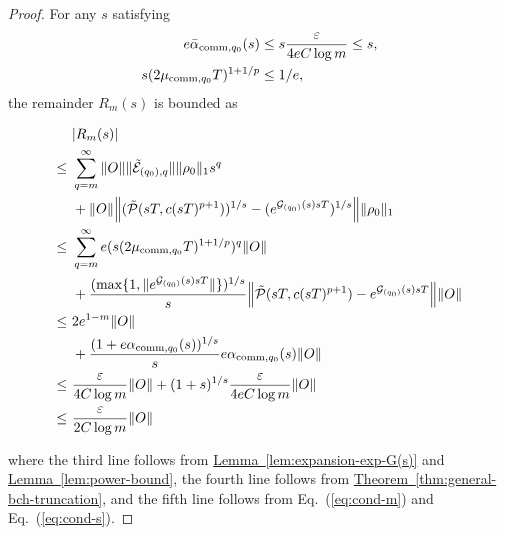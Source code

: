\documentclass[aps,pra,reprint,groupedaddress,floatfix]{revtex4-2}
\newcommand{\eq}[1]{(\ref{eq:#1})}
\newcommand{\thm}[1]{\hyperref[thm:#1]{Theorem~\ref*{thm:#1}}}
\newcommand{\lem}[1]{\hyperref[lem:#1]{Lemma~\ref*{lem:#1}}}
\newcommand{\G}{\mathcal{G}}
\newcommand{\E}{\mathcal{E}}
\newcommand{\eps}{\varepsilon}
\newcommand{\mc}{\mathcal}
\begin{document}
\begin{proof}
   
    For any $s$ satisfying \begin{align}
    \label{eq:cond-s}
        e\bar\alpha_{\mathrm{comm},q_0}(s)
        &\le s\frac{\eps}{4eC \log m} \le s, \notag\\
        s(2\mu_{\mathrm{comm},q_0}T)^{1+1/p}
        &\le 1/e,
    \end{align} the remainder $R_m(s)$ is bounded as
    \begin{widetext}
    \begin{align*}
        &|R_m(s)| \\
        \le ~&\sum_{q=m}^{\infty}\|O\|\|\tilde{\E}_{(q_0),q}\|\|\rho_0\|_1 s^q \\
        &+\|O\|\Big\|(\tilde{\mc P}(sT, c(sT)^{p+1}))^{1/s}
        -(e^{\G_{(q_0)}(s)sT})^{1/s}\Big\|\|\rho_0\|_1 \\
        \le ~& \sum_{q=m}^{\infty} e(s(2\mu_{\mathrm{comm},q_0} T)^{1+1/p})^{q}\|O\|\\
        &+\frac{(\max\{1, \|e^{\G_{(q_0)}(s) sT}\|\})^{1/s}}{s}
        \Bigl\|\tilde{\mc P}(sT, c(sT)^{p+1})-e^{\G_{(q_0)}(s)sT}\Bigr\|\|O\|\\
        \le ~&2e^{1-m} \|O\| \\
        &+\frac{(1+e\alpha_{\mathrm{comm},q_0}(s))^{1/s}}{s}
        e\alpha_{\mathrm{comm},q_0}(s)\|O\| \\
        \le ~& \frac{\eps}{4C\log m} \|O\|
        +(1+s)^{1/s}\frac{\eps}{4eC\log m}\|O\| \\
        \le ~& \frac{\eps}{2C\log m} \|O\|
    \end{align*}
    \end{widetext}
    where the third line follows from \lem{expansion-exp-G(s)} and \lem{power-bound}, the fourth line follows from 
    \thm{general-bch-truncation}, and the fifth line follows from Eq.~\eq{cond-m} and Eq.~\eq{cond-s}.
    

\end{proof}
\end{document}
